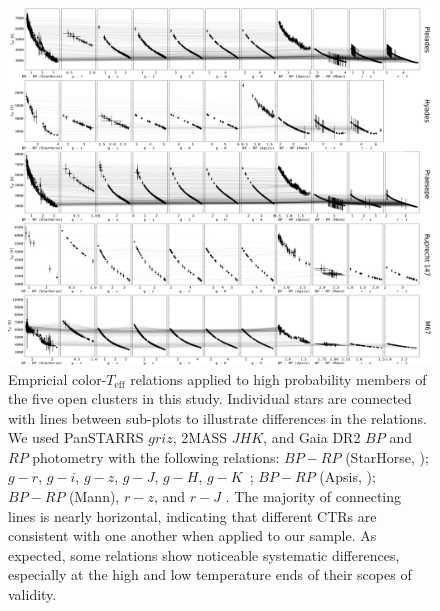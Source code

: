 \documentclass{aa}
\begin{document}
   \begin{figure}
		\centering
           \includegraphics[angle=90, width=\hsize]{pics/clusters/Teff_spread_all.png}

      \caption{Empricial color-$T_\mathrm{eff}$ relations applied to high probability members of the five open clusters in this study. Individual stars are connected with lines between sub-plots to illustrate differences in the relations. We used PanSTARRS $griz$, 2MASS $JHK$, and Gaia DR2 $BP$ and $RP$ photometry with the following relations: $BP-RP$ (StarHorse, \citealt{anders_starhorse_2019}); $g-r$, $g-i$, $g-z$, $g-J$, $g-H$, $g-K$~\citep{boyajian_stellar_2013}; $BP-RP$ (Apsis, \citealt{andrae_gaiaapsis_2018}); $BP-RP$ (Mann), $r-z$, and $r-J$ \citep{mann_erratum_2016}. The majority of connecting lines is nearly horizontal, indicating that different CTRs are consistent with one another when applied to our sample. As expected, some relations show noticeable systematic differences, especially at the high and low temperature ends of their scopes of validity.}
         \label{fig:teff_spread}
   \end{figure}
\end{document}

